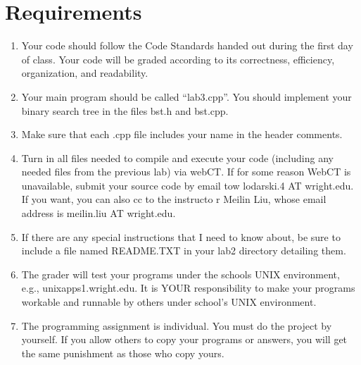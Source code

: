 \documentclass{article}
\begin{document}
\section{Requirements}
\begin{enumerate}
\item Your code should follow the Code Standards handed out during the
  first day of class.  Your code will be graded according to its
  correctness, efficiency, organization, and readability. 
\item Your main program should be called “lab3.cpp”.  You should implement
  your binary search tree in the files bst.h and bst.cpp. 
\item Make sure that each .cpp file includes your name in the header
  comments. 
\item Turn in all files needed to compile and execute your code (including
  any needed files from the previous lab) via webCT. If for some reason
  WebCT is unavailable, submit your source code by email tow lodarski.4
  AT wright.edu. If you want, you can also cc to the instructo r Meilin
  Liu, whose email address is meilin.liu AT wright.edu.   
\item If there are any special instructions that I need to know about, be
  sure to include a file named README.TXT in your lab2 directory
  detailing them. 
\item The grader will test your programs under the schools UNIX
  environment, e.g., unixapps1.wright.edu. It is YOUR responsibility
  to make your programs workable and runnable by others under school’s
  UNIX environment. 
\item The programming assignment is individual. You must do the project by
  yourself. If you allow others to copy your programs or answers, you
  will get the same punishment as those who copy yours. 
\end{enumerate}
\end{document}
